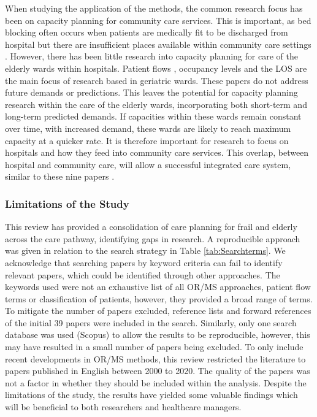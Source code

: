 \documentclass[../thesis.tex]{subfiles}
\begin{document}
When studying the application of the methods, the common research focus has been on capacity planning for community care services. This is important, as bed blocking often occurs when patients are medically fit to be discharged from hospital but there are insufficient places available within community care settings \cite{Katsaliaki}. However, there has been little research into capacity planning for care of the elderly wards within hospitals. Patient flows \cite{Chaussalet}, occupancy levels \cite{Christodoulou} and the LOS \cite{Marshall3} are the main focus of research based in geriatric wards. These papers do not address future demands or predictions. This leaves the potential for capacity planning research within the care of the elderly wards, incorporating both short-term and long-term predicted demands. If capacities within these wards remain constant over time, with increased demand, these wards are likely to reach maximum capacity at a quicker rate. It is therefore important for research to focus on hospitals and how they feed into community care services. This overlap, between hospital and community care, will allow a successful integrated care system, similar to these nine papers \cite{Davari, Intrevado, Johnson,Lim, McClean,Patrick,Ragab, Walker,Zychlinski}.

\subsubsection{Limitations of the Study}
This review has provided a consolidation of care planning for frail and elderly across the care pathway, identifying gaps in research. A reproducible approach was given in relation to the search strategy in Table \ref{tab:Searchterms}. We acknowledge that searching papers by keyword criteria can fail to identify relevant papers, which could be identified through other approaches. The keywords used were not an exhaustive list of all OR/MS approaches, patient flow terms or classification of patients, however, they provided a broad range of terms. To mitigate the number of papers excluded, reference lists and forward references of the initial 39 papers were included in the search. Similarly, only one search database was used (Scopus) to allow the results to be reproducible, however, this may have resulted in a small number of papers being excluded. To only include recent developments in OR/MS methods, this review restricted the literature to papers published in English between 2000 to 2020. The quality of the papers was not a factor in whether they should be included within the analysis. Despite the limitations of the study, the results have yielded some valuable findings which will be beneficial to both researchers and healthcare managers.
\end{document}
